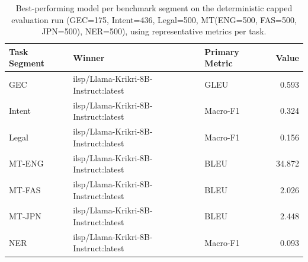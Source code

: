 \begin{table}[t]
\centering
\caption{Best-performing model per benchmark segment on the deterministic capped evaluation run (GEC=175, Intent=436, Legal=500, MT(ENG=500, FAS=500, JPN=500), NER=500), using representative metrics per task.}
\label{tab:capped-task-winners}
\begin{tabular}{lllr}
\toprule
Task Segment & Winner & Primary Metric & Value \\
\midrule
GEC & ilsp/Llama-Krikri-8B-Instruct:latest & GLEU & 0.593 \\
Intent & ilsp/Llama-Krikri-8B-Instruct:latest & Macro-F1 & 0.324 \\
Legal & ilsp/Llama-Krikri-8B-Instruct:latest & Macro-F1 & 0.156 \\
MT-ENG & ilsp/Llama-Krikri-8B-Instruct:latest & BLEU & 34.872 \\
MT-FAS & ilsp/Llama-Krikri-8B-Instruct:latest & BLEU & 2.026 \\
MT-JPN & ilsp/Llama-Krikri-8B-Instruct:latest & BLEU & 2.448 \\
NER & ilsp/Llama-Krikri-8B-Instruct:latest & Macro-F1 & 0.093 \\
\bottomrule
\end{tabular}
\end{table}
